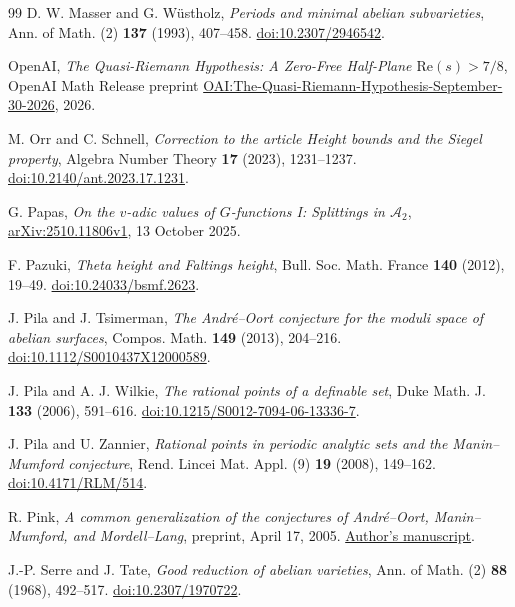 \documentclass[11pt,a4paper]{article}
\numberwithin{equation}{section}
\theoremstyle{definition}
\theoremstyle{remark}
\newcommand{\A}{\mathcal A}
\begin{document}
\begin{thebibliography}{99}
D. W. Masser and G. W\"ustholz,
\emph{Periods and minimal abelian subvarieties},
Ann. of Math. (2) \textbf{137} (1993), 407--458.
\href{https://doi.org/10.2307/2946542}{doi:10.2307/2946542}.

\begingroup\raggedright
OpenAI,
\emph{The Quasi-Riemann Hypothesis: A Zero-Free Half-Plane
\(\mathrm{Re}(s)>7/8\)},
OpenAI Math Release preprint
\href{https://github.com/openai/math/blob/main/preprints/The-Quasi-Riemann-Hypothesis-September-30-2026/paper.pdf}{OAI:The-Quasi-Riemann-Hypothesis-September-30-2026},
2026.
\par\endgroup

M. Orr and C. Schnell,
\emph{Correction to the article Height bounds and the Siegel property},
Algebra Number Theory \textbf{17} (2023), 1231--1237.
\href{https://doi.org/10.2140/ant.2023.17.1231}{doi:10.2140/ant.2023.17.1231}.

G. Papas,
\emph{On the \(v\)-adic values of \(G\)-functions I: Splittings in \(\A_2\)},
\href{https://arxiv.org/abs/2510.11806v1}{arXiv:2510.11806v1},
13 October 2025.

F. Pazuki,
\emph{Theta height and Faltings height},
Bull. Soc. Math. France \textbf{140} (2012), 19--49.
\href{https://doi.org/10.24033/bsmf.2623}{doi:10.24033/bsmf.2623}.

J. Pila and J. Tsimerman,
\emph{The Andr\'e--Oort conjecture for the moduli space of abelian surfaces},
Compos. Math. \textbf{149} (2013), 204--216.
\href{https://doi.org/10.1112/S0010437X12000589}
{doi:10.1112/S0010437X12000589}.

J. Pila and A. J. Wilkie,
\emph{The rational points of a definable set},
Duke Math. J. \textbf{133} (2006), 591--616.
\href{https://doi.org/10.1215/S0012-7094-06-13336-7}
{doi:10.1215/S0012-7094-06-13336-7}.

J. Pila and U. Zannier,
\emph{Rational points in periodic analytic sets and the Manin--Mumford conjecture},
Rend. Lincei Mat. Appl. (9) \textbf{19} (2008), 149--162.
\href{https://doi.org/10.4171/RLM/514}{doi:10.4171/RLM/514}.

R. Pink,
\emph{A common generalization of the conjectures of Andr\'e--Oort,
Manin--Mumford, and Mordell--Lang}, preprint, April 17, 2005.
\href{https://people.math.ethz.ch/~pink/ftp/AOMMML.pdf}{Author's manuscript}.

J.-P. Serre and J. Tate,
\emph{Good reduction of abelian varieties},
Ann. of Math. (2) \textbf{88} (1968), 492--517.
\href{https://doi.org/10.2307/1970722}{doi:10.2307/1970722}.


\end{thebibliography}
\end{document}
